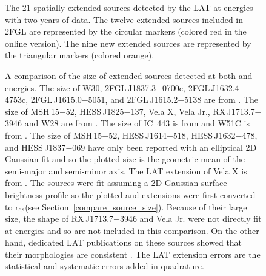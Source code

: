 \documentclass[12pt,preprint]{aastex}
\newif\ifcolorfigure
\newcommand{\gev}{\text{GeV}\xspace}
\newcommand{\tev}{\text{TeV}\xspace}
\newcommand{\rsixeight}{{\ensuremath{\text{r}_{68}}}\xspace}
\begin{document}
\clearpage
  \begin{figure}
      \ifcolorfigure
      \plotone{summary_plots/allsky_extended_sources_color.eps}
      \else
      \fi
      \caption{The 21
      spatially extended sources detected by the LAT
      at \gev energies 
      with two years of data.  The twelve extended sources included in
      2FGL are represented by the circular markers (colored red in the online
      version).  The nine new extended sources are represented by
      the triangular markers (colored orange).}
\label{allsky_extended_sources}
  \end{figure}


\clearpage
\begin{figure}
    \ifcolorfigure
      \plotone{summary_plots/gev_vs_tev_plot_color.eps}
    \else
      \fi
    \caption{
    A comparison of the size of extended sources detected at
    both \gev and \tev energies.  The \tev size of W30,
    2FGL\,J1837.3$-$0700c, 2FGL\,J1632.4$-$4753c, 2FGL\,J1615.0$-$5051,
    and 2FGL\,J1615.2$-$5138 are from \cite{hess_plane_survey}.
    The \tev size of MSH\,15$-$52, HESS\,J1825$-$137,
    Vela X, Vela Jr., RX\,J1713.7$-$3946 and W28 are from
    \cite{msh_15_52_hess,hess_j1825_hess,vela_x_hess,vela_jr_hess,rx_j1713_hess,w28_hess}.
    The \tev size of IC~443 is from \cite{ic443_veritas} and
    W51C is from \cite{w51c_with_magic_at_fermi_symposium}.  The \tev
    size of MSH\,15$-$52, HESS\,J1614$-$518, HESS\,J1632$-$478, and
    HESS\,J1837$-$069 have only been reported with an elliptical 2D
    Gaussian fit and so the plotted size is the geometric 
    mean of the semi-major and semi-minor axis.
    The LAT extension of
    Vela X is from \cite{velax}. 
    The \tev sources were fit assuming a 2D Gaussian surface brightness profile
    so the plotted \gev and \tev extensions were first converted to
    \rsixeight (see Section~\ref{compare_source_size}).  
    Because of
    their large size, the shape of RX\,J1713.7$-$3946 and Vela Jr.
    were not directly fit at \tev energies and so are not included
    in this comparison. On the other hand, dedicated LAT publications on
    these sources showed that their morphologies are consistent
    \citep{rx_j1713_lat,vela_jr_lat}.
    The LAT
    extension errors are the statistical and systematic errors added
    in quadrature. 
}\label{gev_vs_tev_plot}
  \end{figure}
\end{document}
